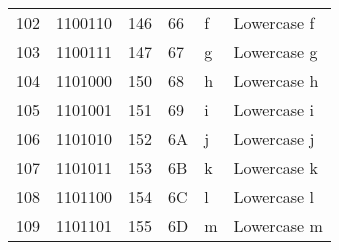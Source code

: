 \begin{center}
\begin{longtable}{llllll}
\rowcolor[HTML]{F3F6F6} 
{\color[HTML]{404040} 102}              & {\color[HTML]{404040} 1100110}         & {\color[HTML]{404040} 146}            & {\color[HTML]{404040} 66}                   & {\color[HTML]{404040} f}                  & {\color[HTML]{404040} Lowercase f}                           \\
\rowcolor[HTML]{FCFCFC} 
{\color[HTML]{404040} 103}              & {\color[HTML]{404040} 1100111}         & {\color[HTML]{404040} 147}            & {\color[HTML]{404040} 67}                   & {\color[HTML]{404040} g}                  & {\color[HTML]{404040} Lowercase g}                           \\
\rowcolor[HTML]{F3F6F6} 
{\color[HTML]{404040} 104}              & {\color[HTML]{404040} 1101000}         & {\color[HTML]{404040} 150}            & {\color[HTML]{404040} 68}                   & {\color[HTML]{404040} h}                  & {\color[HTML]{404040} Lowercase h}                           \\
\rowcolor[HTML]{FCFCFC} 
{\color[HTML]{404040} 105}              & {\color[HTML]{404040} 1101001}         & {\color[HTML]{404040} 151}            & {\color[HTML]{404040} 69}                   & {\color[HTML]{404040} i}                  & {\color[HTML]{404040} Lowercase i}                           \\
\rowcolor[HTML]{F3F6F6} 
{\color[HTML]{404040} 106}              & {\color[HTML]{404040} 1101010}         & {\color[HTML]{404040} 152}            & {\color[HTML]{404040} 6A}                   & {\color[HTML]{404040} j}                  & {\color[HTML]{404040} Lowercase j}                           \\
\rowcolor[HTML]{FCFCFC} 
{\color[HTML]{404040} 107}              & {\color[HTML]{404040} 1101011}         & {\color[HTML]{404040} 153}            & {\color[HTML]{404040} 6B}                   & {\color[HTML]{404040} k}                  & {\color[HTML]{404040} Lowercase k}                           \\
\rowcolor[HTML]{F3F6F6} 
{\color[HTML]{404040} 108}              & {\color[HTML]{404040} 1101100}         & {\color[HTML]{404040} 154}            & {\color[HTML]{404040} 6C}                   & {\color[HTML]{404040} l}                  & {\color[HTML]{404040} Lowercase l}                           \\
\rowcolor[HTML]{FCFCFC} 
{\color[HTML]{404040} 109}              & {\color[HTML]{404040} 1101101}         & {\color[HTML]{404040} 155}            & {\color[HTML]{404040} 6D}                   & {\color[HTML]{404040} m}                  & {\color[HTML]{404040} Lowercase m}                           \\

\end{longtable}
\end{center}
